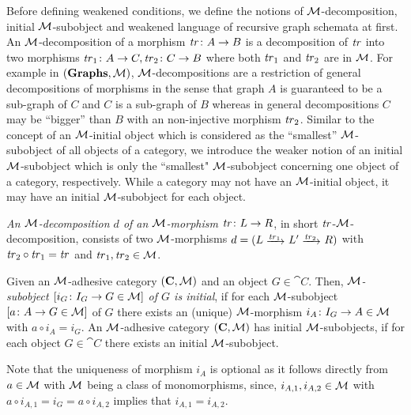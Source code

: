 Before defining weakened conditions, we define the notions of ${\cal M}$-decomposition, initial ${\cal M}$-subobject and weakened language of recursive graph schemata at first.
An ${\cal M}$-decomposition of a morphism $\mathit{tr}\colon A \to B$ is a decomposition of $\mathit{tr}$ into two morphisms $\mathit{tr}_1\colon A \to C,\mathit{tr}_2\colon C\to B$ where both $\mathit{tr}_1$ and $\mathit{tr}_2$ are in ${\cal M}$.
For example in $(\mathbf{\mathbf{Graphs}},{\cal M})$, ${\cal M}$-decompositions are a restriction of general decompositions of morphisms in the sense that graph $A$ is guaranteed to be a sub-graph of $C$ and $C$ is a sub-graph of $B$ whereas in general decompositions $C$ may be ``bigger'' than $B$ with an non-injective morphism $\mathit{tr}_2$.
Similar to the concept of an ${\cal M}$-initial object which is considered as the ``smallest'' ${\cal M}$-subobject of all objects of a category, we introduce the weaker notion of an initial ${\cal M}$-subobject which is only the ``smallest" ${\cal M}$-subobject concerning one object of a category, respectively.
While a category may not have an ${\cal M}$-initial object, it may have an initial ${\cal M}$-subobject for each object.
 
\begin{definition}
\emph{An ${\cal M}$-decomposition $d$ of an ${\cal M}$-morphism $\mathit{tr}\colon L \to R$}, in short $\mathit{tr}$-${\cal M}$-decomposition, consists of two ${\cal M}$-morphisms $d=(L \trans{\tr_1} L' \trans{\tr_2} R)$ with $\mathit{tr}_2 \circ \mathit{tr}_1 = \mathit{tr}$ and $\mathit{tr}_1, \mathit{tr}_2 \in {\cal M}$.
\envEndMarker
\end{definition}

\begin{definition}
\label{def:sec-compl-software-trans:in_M_subobj}
Given an ${\cal M}$-adhesive category $(\mathbf{C},{\cal M})$ and an object $G \in \cat{C}$.
Then, \emph{${\cal M}$-subobject $[i_G\colon I_G \to G \in {\cal M}]$ of $G$ is initial}, if for each ${\cal M}$-subobject $[a\colon A \to G \in {\cal M}]$ of $G$ there exists an (unique) ${\cal M}$-morphism $i_A\colon I_G \to A \in {\cal M}$ with $a \circ i_A = i_G$.
An ${\cal M}$-adhesive category $(\mathbf{C},{\cal M})$ has initial ${\cal M}$-subobjects, if for each object $G \in \cat{C}$ there exists an initial ${\cal M}$-subobject.
\envEndMarker
\end{definition}

\begin{remark}
\label{rem:sec-compl-software-trans:in_M_subobj}
Note that the uniqueness of morphism $i_A$ is optional as it follows directly from $a \in {\cal M}$ with ${\cal M}$ being a class of monomorphisms, since, $i_{A,1},i_{A,2} \in {\cal M}$ with $a \circ i_{A,1}=i_G=a \circ i_{A,2}$ implies that $i_{A,1}=i_{A,2}$.
\envEndMarker
\end{remark}

